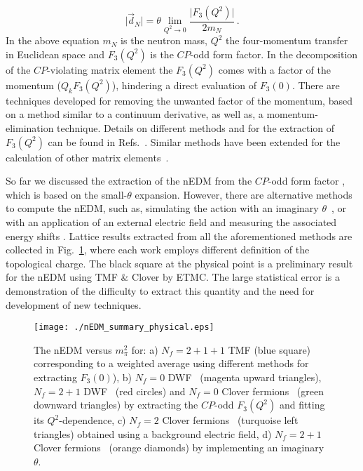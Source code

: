 \documentclass[epj]{webofc}
\newcommand{\cl}{\centerline}
\newcommand{\be}{\begin{equation}}
\newcommand{\ee}{\end{equation}}
\begin{document}
\be
\vert \vec{d}_N \vert =  \theta \lim_{Q^2 \to 0} \frac{\vert F_3(Q^2) \vert}{2 m_N}\,.
\label{eq:dN}
\ee
In the above equation $m_N$ is the neutron mass, $Q^2$ the four-momentum transfer in Euclidean space and
$F_3(Q^2)$ is the $CP$-odd form factor. In the decomposition of the 
$CP$-violating matrix element the $F_3(Q^2)$ comes with a factor of the momentum ($Q_k F_3(Q^2)$), hindering a
direct evaluation of $F_3(0)$. There are techniques developed for removing the unwanted factor of the momentum, based
on a method similar to a continuum derivative, as well as, a momentum-elimination technique. Details on different methods and
for the extraction of $F_3(Q^2)$ can be found in Refs.~\cite{Alexandrou:2016rbj,Alexandrou:2015spa}.
Similar methods have been extended for the calculation of other matrix elements~\cite{Bouchard:2016gmc}.

So far we discussed the extraction of the nEDM from the $CP$-odd form factor
\cite{Shintani:2005xg,Shintani:2014zra,Shindler:2015aqa,Alexandrou:2015spa}, which is
based on the small-$\theta$ expansion. However, there are alternative methods to 
compute the nEDM, such as, simulating the action with an imaginary $\theta$~\cite{Guo:2015tla}, 
or with an application of an external electric field and measuring the associated
energy shifts \cite{Shintani:2008nt}. Lattice results extracted from all the
aforementioned methods are collected in Fig.~\ref{nEDM}, where each work employs 
different definition of the topological charge. The black square at the physical point is a preliminary
result for the nEDM using TMF $\&$ Clover by ETMC. The large statistical error is a demonstration
of the difficulty to extract this quantity and the need for development of new techniques. 

\begin{figure}[!h]
\cl{\texttt{[image: ./nEDM\_summary\_physical.eps]}}
\caption{The nEDM versus $m_\pi^2$ for: a) $N_f{=}2{+}1{+}1$ TMF
\cite{Alexandrou:2015spa} (blue square) corresponding to a
weighted average using different methods for extracting $F_3(0)$), 
b) $N_f{=}0$ DWF~\cite{Shintani:2005xg} (magenta upward triangles),
$N_f{=}2{+}1$ DWF~\cite{Shintani:2014zra} (red circles) and 
$N_f{=}0$ Clover fermions~\cite{Shindler:2015aqa} (green downward triangles) by extracting
the $CP$-odd $F_3(Q^2)$ and fitting its $Q^2$-dependence, c) $N_f{=}2$
Clover fermions~\cite{Shintani:2008nt} (turquoise left triangles) 
obtained using a background electric field, d) $N_f{=}2{+}1$ Clover
fermions~\cite{Guo:2015tla} (orange diamonds) by implementing an
imaginary $\theta$.}
\label{nEDM}
\end{figure}
\FloatBarrier
\end{document}
